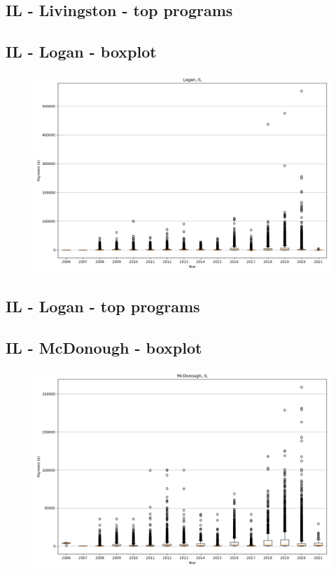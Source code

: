 \subsection*{IL - Livingston - top programs}

\newpage
\subsection*{IL - Logan - boxplot}
\begin{figure}[h]
\centering
\includegraphics[width=7in]{../output/boxplots/counties/Logan-IL_boxplot.png}
\end{figure}


\subsection*{IL - Logan - top programs}

\newpage
\subsection*{IL - McDonough - boxplot}
\begin{figure}[h]
\centering
\includegraphics[width=7in]{../output/boxplots/counties/McDonough-IL_boxplot.png}
\end{figure}


